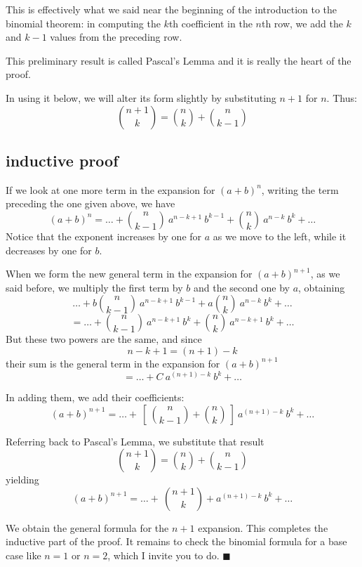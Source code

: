 \documentclass[11pt, oneside]{article}   	%
\begin{document}
This is effectively what we said near the beginning of the introduction to the binomial theorem:  in computing the $k$th coefficient in the $n$th row, we add the $k$ and $k-1$ values from the preceding row.

This preliminary result is called Pascal's Lemma and it is really the heart of the proof.

In using it below, we will alter its form slightly by substituting $n+1$ for $n$.  Thus:
\[  {{n+1}\choose{k}} = {{n}\choose{k}} + {{n}\choose{k-1}} \]

\subsection*{inductive proof}

If we look at one more term in the expansion for $(a+b)^n$, writing the term preceding the one given above, we have
\[ (a+b)^n = \dots + {{n}\choose{k-1}} \ a^{n-k+1} \ b^{k-1} + {{n}\choose{k}} \ a^{n-k} \ b^k + \dots  \]
Notice that the exponent increases by one for $a$ as we move to the left, while it decreases by one for $b$.

When we form the new general term in the expansion for $(a+b)^{n+1}$, as we said before, we multiply the first term by $b$ and the second one by $a$, obtaining
\[ \dots + b {{n}\choose{k-1}} \ a^{n-k+1} \ b^{k-1} + a {{n}\choose{k}} \ a^{n-k} \ b^k + \dots  \]
\[ = \dots +  {{n}\choose{k-1}} \ a^{n-k+1} \ b^{k} + {{n}\choose{k}} \ a^{n-k + 1} \ b^k + \dots  \]
But these two powers are the same, and since
\[ n-k+1 = (n + 1) - k \]
their sum is the general term in the expansion for $(a+b)^{n+1}$
\[ = \dots + C \ a^{(n+1)-k} \ b^k + \dots  \]


In adding them, we add their coefficients:
\[ (a+b)^{n+1} = \dots +  \ [ \ {{n}\choose{k-1}} + {{n}\choose{k}} \ ] \  a^{(n+1)-k} \ b^{k} + \dots  \]

Referring back to Pascal's Lemma, we substitute that result
\[  {{n+1}\choose{k}} = {{n}\choose{k}} + {{n}\choose{k-1}} \]
yielding
\[ (a+b)^{n+1} = \dots +  \ {{n+1}\choose{k}} + a^{(n+1)-k} \ b^{k} + \dots  \]

We obtain the general formula for the $n+1$ expansion.  This completes the inductive part of the proof.  It remains to check the binomial formula for a base case like $n=1$ or $n=2$, which I invite you to do.
$\blacksquare$
\end{document}
